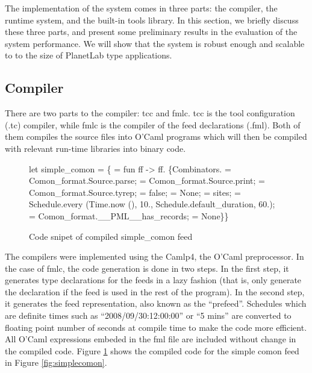 The implementation of the \padsd{} system comes in
three parts: the compiler, the runtime system, and the
built-in tools library. In this section, we briefly
discuss these three parts, and present some preliminary
results in the evaluation of the system performance. 
We will show that the system is robust enough and scalable to
to the size of PlanetLab type applications. 

\subsection{Compiler}
There are two parts to the \padsd{} compiler: tcc and fmlc.
tcc is the tool configuration (.tc) compiler, while fmlc is the
compiler of the feed declarations (.fml). Both of them
compiles the source files into O'Caml programs which will
then be compiled with relevant run-time libraries into 
binary code. 

\begin{figure}[th]
\centering
\begin{codebox}
let simple_comon =
\{ = fun ff ->
 ff.
 \{Combinators. = Comon_format.Source.parse;
   = Comon_format.Source.print;
   = Comon_format.Source.tyrep; 
   = false;
   = None; 
   = sites;
   =
    Schedule.{\kw every} (Time.now (), 10., 
                    Schedule.default_duration, 60.);
   = Comon_format.__PML__has_records; 
   = None\}\}
\end{codebox}
\caption{Code snipet of compiled simple\_comon feed}\label{fig:compiledcomon}
\end{figure}

The compilers were implemented using the Camlp4, the O'Caml
preprocessor. 
In the case of fmlc, the code generation is done in two steps.
In the first step, it generates type declarations for the feeds in a
lazy fashion (that is, only generate the declaration if the
feed is used in the rest of the program).
In the second step, it generates the feed representation,
also known as the ``prefeed''. Schedules which are
definite times such as ``2008/09/30:12:00:00'' or ``5 mins'' are
converted to floating point number of seconds at compile time
to make the code more efficient.
All O'Caml expressions embeded in the fml file are
included without change in the compiled code. 
Figure \ref{fig:compiledcomon} shows the compiled code for
the simple comon feed in Figure \ref{fig:simplecomon}.

